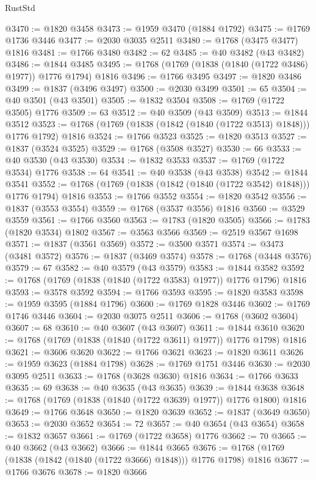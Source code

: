 \begin{lexlean}{RustStd}
\begin{coremodule}
@3470 := @1820 @3458
@3473 := @1959 @3470 (@1884 @1792)
@3475 := @1769 @1736 @3446
@3477 := @2030 @3035 @2511
@3480 := @1768 (@3475 @3477) @1816
@3481 := @1766 @3480
@3482 := 62
@3485 := @40 @3482 (@43 @3482)
@3486 := @1844 @3485
@3495 := @1768 (@1769 (@1838 (@1840 (@1722 @3486) @1977)) @1776 @1794) @1816
@3496 := @1766 @3495
@3497 := @1820 @3486
@3499 := @1837 (@3496 @3497)
@3500 := @2030 @3499
@3501 := 65
@3504 := @40 @3501 (@43 @3501)
@3505 := @1832 @3504
@3508 := @1769 (@1722 @3505) @1776
@3509 := 63
@3512 := @40 @3509 (@43 @3509)
@3513 := @1844 @3512
@3523 := @1768 (@1769 (@1838 (@1842 (@1840 (@1722 @3513) @1848))) @1776 @1792) @1816
@3524 := @1766 @3523
@3525 := @1820 @3513
@3527 := @1837 (@3524 @3525)
@3529 := @1768 (@3508 @3527)
@3530 := 66
@3533 := @40 @3530 (@43 @3530)
@3534 := @1832 @3533
@3537 := @1769 (@1722 @3534) @1776
@3538 := 64
@3541 := @40 @3538 (@43 @3538)
@3542 := @1844 @3541
@3552 := @1768 (@1769 (@1838 (@1842 (@1840 (@1722 @3542) @1848))) @1776 @1794) @1816
@3553 := @1766 @3552
@3554 := @1820 @3542
@3556 := @1837 (@3553 @3554)
@3559 := @1768 (@3537 @3556) @1816
@3560 := @3529 @3559
@3561 := @1766 @3560
@3563 := @1783 (@1820 @3505)
@3566 := @1783 (@1820 @3534) @1802
@3567 := @3563 @3566
@3569 := @2519 @3567 @1698
@3571 := @1837 (@3561 @3569)
@3572 := @3500 @3571
@3574 := @3473 (@3481 @3572)
@3576 := @1837 (@3469 @3574)
@3578 := @1768 (@3448 @3576)
@3579 := 67
@3582 := @40 @3579 (@43 @3579)
@3583 := @1844 @3582
@3592 := @1768 (@1769 (@1838 (@1840 (@1722 @3583) @1977)) @1776 @1796) @1816
@3593 := @3578 @3592
@3594 := @1766 @3593
@3595 := @1820 @3583
@3598 := @1959 @3595 (@1884 @1796)
@3600 := @1769 @1828 @3446
@3602 := @1769 @1746 @3446
@3604 := @2030 @3075 @2511
@3606 := @1768 (@3602 @3604)
@3607 := 68
@3610 := @40 @3607 (@43 @3607)
@3611 := @1844 @3610
@3620 := @1768 (@1769 (@1838 (@1840 (@1722 @3611) @1977)) @1776 @1798) @1816
@3621 := @3606 @3620
@3622 := @1766 @3621
@3623 := @1820 @3611
@3626 := @1959 @3623 (@1884 @1798)
@3628 := @1769 @1751 @3446
@3630 := @2030 @3095 @2511
@3633 := @1768 (@3628 @3630) @1816
@3634 := @1766 @3633
@3635 := 69
@3638 := @40 @3635 (@43 @3635)
@3639 := @1844 @3638
@3648 := @1768 (@1769 (@1838 (@1840 (@1722 @3639) @1977)) @1776 @1800) @1816
@3649 := @1766 @3648
@3650 := @1820 @3639
@3652 := @1837 (@3649 @3650)
@3653 := @2030 @3652
@3654 := 72
@3657 := @40 @3654 (@43 @3654)
@3658 := @1832 @3657
@3661 := @1769 (@1722 @3658) @1776
@3662 := 70
@3665 := @40 @3662 (@43 @3662)
@3666 := @1844 @3665
@3676 := @1768 (@1769 (@1838 (@1842 (@1840 (@1722 @3666) @1848))) @1776 @1798) @1816
@3677 := @1766 @3676
@3678 := @1820 @3666

\end{coremodule}
\end{lexlean}
